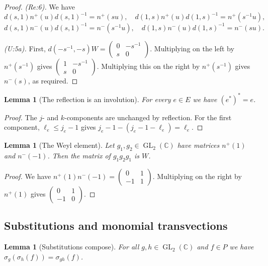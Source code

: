\documentclass[11pt]{article}
\newtheorem{lemma}[theorem]{Lemma}
\theoremstyle{definition}
\theoremstyle{remark}
\newcommand{\CC}{\mathbb{C}}
\DeclareMathOperator{\GL}{GL}
\begin{document}
\begin{proof}
\emph{(Re:6).} We have
\[
d(s,1)n^+(u)d(s,1)^{-1}=n^+(su),\quad d(1,s)n^+(u)d(1,s)^{-1}=n^+(s^{-1}u),
\]
\[
d(s,1)n^-(u)d(s,1)^{-1}=n^-(s^{-1}u),\quad d(1,s)n^-(u)d(1,s)^{-1}=n^-(su).
\]

\emph{(U:5a).} First, $d(-s^{-1},-s)W=\begin{pmatrix}0&-s^{-1}\\ s&0\end{pmatrix}$. Multiplying on the left by $n^+(s^{-1})$ gives $\begin{pmatrix}1&-s^{-1}\\ s&0\end{pmatrix}$. Multiplying this on the right by $n^+(s^{-1})$ gives $n^-(s)$, as required.
\end{proof}

\begin{lemma}[The reflection is an involution]\label{lem:gm_refl_refl}
For every $e\in E$ we have $(e^\ast)^\ast=e$.
\end{lemma}

\begin{proof}
The $j$- and $k$-components are unchanged by reflection. For the first component, $\ell_e\le j_e-1$ gives $j_e-1-(j_e-1-\ell_e)=\ell_e$.
\end{proof}

\begin{lemma}[The Weyl element]\label{lem:gm_weyl_matrix}
Let $g_1,g_2\in\GL_2(\CC)$ have matrices $n^+(1)$ and $n^-(-1)$. Then the matrix of $g_1g_2g_1$ is $W$.
\end{lemma}

\begin{proof}
We have $n^+(1)n^-(-1)=\begin{pmatrix}0&1\\-1&1\end{pmatrix}$. Multiplying on the right by $n^+(1)$ gives $\begin{pmatrix}0&1\\-1&0\end{pmatrix}$.
\end{proof}

\subsection{Substitutions and monomial transvections}

\begin{lemma}[Substitutions compose]\label{lem:gm_aeval_subst_mul}
For all $g,h\in\GL_2(\CC)$ and $f\in P$ we have $\sigma_g(\sigma_h(f))=\sigma_{gh}(f)$.
\end{lemma}
\end{document}
